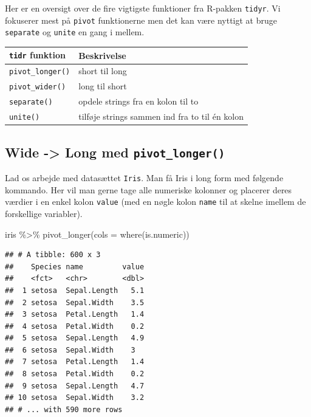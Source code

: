 \documentclass[
]{book}
\newenvironment{Shaded}{\begin{snugshade}}{\end{snugshade}}
\newcommand{\AttributeTok}[1]{\textcolor[rgb]{0.77,0.63,0.00}{#1}}
\newcommand{\FunctionTok}[1]{\textcolor[rgb]{0.00,0.00,0.00}{#1}}
\newcommand{\NormalTok}[1]{#1}
\newcommand{\SpecialCharTok}[1]{\textcolor[rgb]{0.00,0.00,0.00}{#1}}
\begin{document}
Her er en oversigt over de fire vigtigste funktioner fra R-pakken \texttt{tidyr}. Vi fokuserer mest på \texttt{pivot} funktionerne men det kan være nyttigt at bruge \texttt{separate} og \texttt{unite} en gang i mellem.

\begin{longtable}[]{@{}ll@{}}
\toprule
\texttt{tidr} funktion & Beskrivelse \\
\midrule
\endhead
\texttt{pivot\_longer()} & short til long \\
\texttt{pivot\_wider()} & long til short \\
\texttt{separate()} & opdele strings fra en kolon til to \\
\texttt{unite()} & tilføje strings sammen ind fra to til én kolon \\
\bottomrule
\end{longtable}

\hypertarget{wide---long-med-pivot_longer}{%
\subsection{\texorpdfstring{Wide -\textgreater{} Long med \texttt{pivot\_longer()}}{Wide -\textgreater{} Long med pivot\_longer()}}\label{wide---long-med-pivot_longer}}

Lad os arbejde med datasættet \texttt{Iris}. Man få Iris i long form med følgende kommando. Her vil man gerne tage alle numeriske kolonner og placerer deres værdier i en enkel kolon \texttt{value} (med en nøgle kolon \texttt{name} til at skelne imellem de forskellige variabler).

\begin{Shaded}
\begin{Highlighting}[]
\NormalTok{iris }\SpecialCharTok{\%\textgreater{}\%} \FunctionTok{pivot\_longer}\NormalTok{(}\AttributeTok{cols =} \FunctionTok{where}\NormalTok{(is.numeric))}
\end{Highlighting}
\end{Shaded}

\begin{verbatim}
## # A tibble: 600 x 3
##    Species name         value
##    <fct>   <chr>        <dbl>
##  1 setosa  Sepal.Length   5.1
##  2 setosa  Sepal.Width    3.5
##  3 setosa  Petal.Length   1.4
##  4 setosa  Petal.Width    0.2
##  5 setosa  Sepal.Length   4.9
##  6 setosa  Sepal.Width    3  
##  7 setosa  Petal.Length   1.4
##  8 setosa  Petal.Width    0.2
##  9 setosa  Sepal.Length   4.7
## 10 setosa  Sepal.Width    3.2
## # ... with 590 more rows
\end{verbatim}
\end{document}
